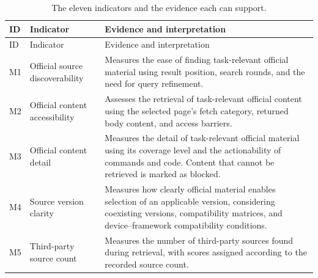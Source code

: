 \documentclass[manuscript,review,anonymous]{acmart}
\begin{document}
\begin{longtable}[]{@{}
  >{\raggedright\arraybackslash}p{}
  >{\raggedright\arraybackslash}p{}
  >{\raggedright\arraybackslash}p{}@{}}
\caption{The eleven indicators and the evidence each can support.}\tabularnewline
\toprule\noalign{}
\begin{minipage}[b]{\linewidth}\raggedright
ID
\end{minipage} & \begin{minipage}[b]{\linewidth}\raggedright
Indicator
\end{minipage} & \begin{minipage}[b]{\linewidth}\raggedright
Evidence and interpretation
\end{minipage} \\
\midrule\noalign{}
\endfirsthead
\toprule\noalign{}
\begin{minipage}[b]{\linewidth}\raggedright
ID
\end{minipage} & \begin{minipage}[b]{\linewidth}\raggedright
Indicator
\end{minipage} & \begin{minipage}[b]{\linewidth}\raggedright
Evidence and interpretation
\end{minipage} \\
\midrule\noalign{}
\endhead
\bottomrule\noalign{}
\endlastfoot
M1 & Official source discoverability & Measures the ease of finding task-relevant official material using result position, search rounds, and the need for query refinement. \\
M2 & Official content accessibility & Assesses the retrieval of task-relevant official content using the selected page's fetch category, returned body content, and access barriers. \\
M3 & Official content detail & Measures the detail of task-relevant official material using its coverage level and the actionability of commands and code. Content that cannot be retrieved is marked as blocked. \\
M4 & Source version clarity & Measures how clearly official material enables selection of an applicable version, considering coexisting versions, compatibility matrices, and device--framework compatibility conditions. \\
M5 & Third-party source count & Measures the number of third-party sources found during retrieval, with scores assigned according to the recorded source count. \\

\end{longtable}
\end{document}
